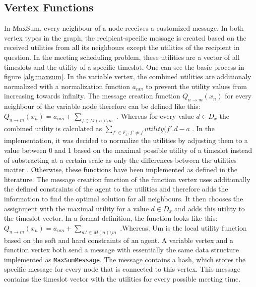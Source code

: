 \subsection{Vertex Functions} 
In MaxSum, every neighbour of a node receives a customized message. In both vertex types in the graph, the recipient-specific message is created based on the received utilities from all its neighbours except the utilities of the recipient in question. In the meeting scheduling problem, these utilities are a vector of all timeslots and the utility of a specific timeslot. One can see the basic process in figure \ref{alg:maxsum}.
In the variable vertex, the combined utilities are additionaly normalized with a normalization function 
\(a_{nm}\)
 to prevent the utility values from increasing towards infinity. The message creation function 
\(Q_{n \rightarrow m}(x_{n})\) 
for every neighbour of the variable node therefore can be defined like this: 
\(Q_{n \rightarrow  m}(x_{n}) 
= a_{nm} + 
\sum_{f \in M (n) \setminus  m }  \) 
\cite{Farinelli2008}.  Whereas for every value 
\(d \in D_{x}\)
 the combined utility is calculated as 
\(\sum_{f' \in F_{x}, f' \neq f}  utility(f'.d - a \)
. In the implementation, it was decided to normalize the utilities by adjusting them to a value between 0 and 1 based on the maximal possible utility of a timeslot instead of substracting at a certain scale as only the differences between the utilities matter \cite{Zivan2012}. Otherwise, these functions have been implemented as defined in the literature.
The message creation function of the function vertex uses additionally the defined constraints of the agent to the utilities and therefore adds the information to find the optimal solution for all neighbours. It then chooses the assignment with the maximal utility for a value 
\(d \in D_{x}\) 
and adds this utility to the timeslot vector. In a formal definition, the function looks like this: 
\(Q_{n \rightarrow  m}(x_{n}) = a_{nm} + \sum_{m' \in M (n) \setminus m }  \) 
\cite{Farinelli2008}.Whereas, Um is the local utility function based on the soft and hard constraints of an agent.
A variable vertex and a function vertex both send a message with essentially the same data structure implemented as \texttt{MaxSumMessage}. The message contains a hash, which stores the specific message for every node that is connected to this vertex. This message contains the timeslot vector with the utilities for every possible meeting time.



